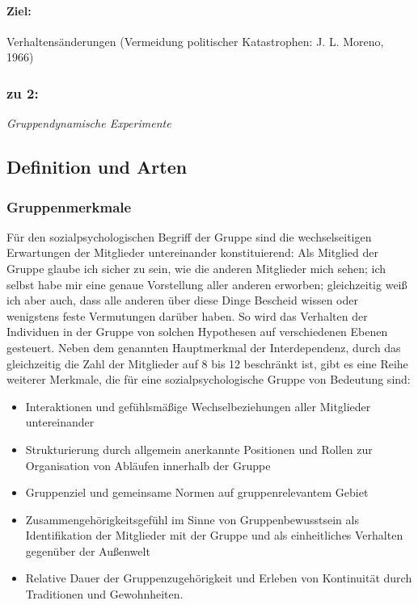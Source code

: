 \documentclass[12pt]{scrartcl}
\begin{document}
\paragraph{Ziel:} Verhaltensänderungen (Vermeidung politischer Katastrophen: J.
L. Moreno, 1966)

\subsubsection*{zu 2:} \emph{Gruppendynamische Experimente}

\subsection{Definition und Arten}

\subsubsection{Gruppenmerkmale} \label{subsec:Gruppenmerkmale}
Für den sozialpsychologischen Begriff der Gruppe sind die wechselseitigen
Erwartungen der Mitglieder untereinander konstituierend: Als Mitglied der
Gruppe glaube ich sicher zu sein, wie die anderen Mitglieder mich sehen; ich
selbst habe mir eine genaue Vorstellung aller anderen erworben; gleichzeitig
weiß ich aber auch, dass alle anderen über diese Dinge Bescheid wissen oder
wenigstens feste Vermutungen darüber haben. So wird das Verhalten der
Individuen in der Gruppe von solchen Hypothesen auf verschiedenen Ebenen
gesteuert. Neben dem genannten Hauptmerkmal der Interdependenz, durch das
gleichzeitig die Zahl der Mitglieder auf 8 bis 12 beschränkt ist, gibt es eine
Reihe weiterer Merkmale, die für eine sozialpsychologische Gruppe von Bedeutung
sind:
\begin{itemize}
	\item Interaktionen und gefühlsmäßige Wechselbeziehungen aller Mitglieder
		untereinander
	\item Strukturierung durch allgemein anerkannte Positionen und Rollen zur
		Organisation von Abläufen innerhalb der Gruppe
	\item Gruppenziel und gemeinsame Normen auf gruppenrelevantem Gebiet
	\item Zusammengehörigkeitsgefühl im Sinne von Gruppenbewusstsein als
		Identifikation der Mitglieder mit der Gruppe und als einheitliches
		Verhalten gegenüber der Außenwelt
	\item Relative Dauer der Gruppenzugehörigkeit und Erleben von Kontinuität
		durch Traditionen und Gewohnheiten.
\end{itemize}
\end{document}
